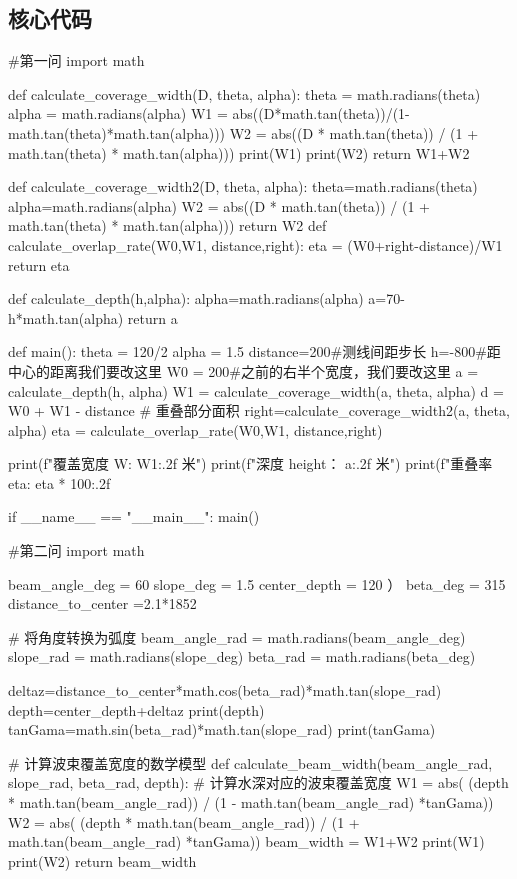 \documentclass[withoutpreface,bwprint]{cumcmthesis} %
\begin{document}
\begin{appendices}
\section{核心代码}

\begin{tcode}
#第一问
import math

def calculate_coverage_width(D, theta, alpha):
    theta = math.radians(theta)
    alpha = math.radians(alpha)
    W1 = abs((D*math.tan(theta))/(1-math.tan(theta)*math.tan(alpha)))
    W2 = abs((D * math.tan(theta)) / (1 + math.tan(theta) * math.tan(alpha)))
    print(W1)
    print(W2)
    return W1+W2

def calculate_coverage_width2(D, theta, alpha):
    theta=math.radians(theta)
    alpha=math.radians(alpha)
    W2 = abs((D * math.tan(theta)) / (1 + math.tan(theta) * math.tan(alpha)))
    return W2
def calculate_overlap_rate(W0,W1, distance,right):
    eta = (W0+right-distance)/W1
    return eta

def calculate_depth(h,alpha):
    alpha=math.radians(alpha)
    a=70-h*math.tan(alpha)
    return a

def main():
    theta = 120/2
    alpha = 1.5
    distance=200#测线间距步长
    h=-800#距中心的距离我们要改这里
    W0 = 200#之前的右半个宽度，我们要改这里
    a = calculate_depth(h, alpha)
    W1 = calculate_coverage_width(a, theta, alpha)
    d = W0 + W1 - distance  # 重叠部分面积
    right=calculate_coverage_width2(a, theta, alpha)
    eta = calculate_overlap_rate(W0,W1, distance,right)

    print(f"覆盖宽度 W: {W1:.2f} 米")
    print(f"深度 height： {a:.2f} 米")
    print(f"重叠率 eta: {eta * 100:.2f}%

if __name__ == "__main__":
    main()


#第二问
import math

beam_angle_deg = 60  
slope_deg = 1.5  
center_depth = 120 ）
beta_deg = 315  
distance_to_center =2.1*1852  

# 将角度转换为弧度
beam_angle_rad = math.radians(beam_angle_deg)
slope_rad = math.radians(slope_deg)
beta_rad = math.radians(beta_deg)

deltaz=distance_to_center*math.cos(beta_rad)*math.tan(slope_rad)
depth=center_depth+deltaz
print(depth)
tanGama=math.sin(beta_rad)*math.tan(slope_rad)
print(tanGama)

# 计算波束覆盖宽度的数学模型
def calculate_beam_width(beam_angle_rad, slope_rad, beta_rad, depth):
    # 计算水深对应的波束覆盖宽度
    W1 = abs(
        (depth * math.tan(beam_angle_rad)) / (1 - math.tan(beam_angle_rad) *tanGama))
    W2 = abs(
        (depth * math.tan(beam_angle_rad)) / (1 + math.tan(beam_angle_rad) *tanGama))
    beam_width = W1+W2
    print(W1)
    print(W2)
    return beam_width


\end{tcode}
\end{appendices}
\end{document}
